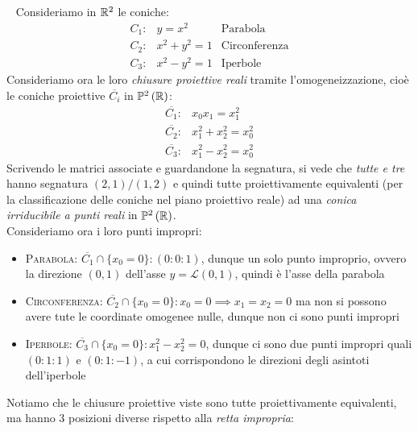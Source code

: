\begin{examples}~{}
	Consideriamo in $\mathbb{R}^2$ le coniche:
	\begin{equation*}
		\begin{array}{cll}
			C_1\colon & y=x^2 & 	\text{Parabola}\\[1mm]
			C_2\colon & x^2+y^2=1 &		\text{Circonferenza}\\[1mm]
			C_3\colon &	x^2-y^2=1 & \text{Iperbole}
		\end{array}
	\end{equation*}
	Consideriamo ora le loro \textit{chiusure proiettive reali} tramite l'omogeneizzazione, cioè le coniche proiettive $\overline{C_i}$ in $\proj[2]{\realset}$:
		\begin{equation*}
		\begin{array}{cl}
			\overline{C_1} \colon & x_0x_1=x_1^2\\[1mm]
			\overline{C_2} \colon & x_1^2+x_2^2=x_0^2\\[1mm]
			\overline{C_3} \colon & x_1^2-x_2^2=x_0^2
		\end{array}
	\end{equation*}
	Scrivendo le matrici associate e guardandone la segnatura, si vede che \textit{tutte e tre} hanno segnatura $(2,1)/(1,2)$ e quindi tutte proiettivamente equivalenti (per la classificazione delle coniche nel piano proiettivo reale) ad una \textit{conica irriducibile a punti reali} in $\proj[2]{\realset}$.\\
	Consideriamo ora i loro punti impropri:
		\begin{itemize}
			\item \textsc{Parabola}: $\overline{C_1}\cap\{x_0=0\}\colon (0\colon 0\colon 1)$, dunque un solo punto improprio, ovvero la direzione $(0,1)$ dell'asse $y=\mathcal{L}(0,1)$, quindi è l'asse della parabola
			\item \textsc{Circonferenza}: $\overline{C_2}\cap \{x_0=0\} \colon x_0=0 \implies x_1=x_2=0$ ma non si possono avere tute le coordinate omogenee nulle, dunque non ci sono punti impropri
			\item \textsc{Iperbole}: $\overline{C_3}\cap\{x_0=0\}\colon x_1^2-x_2^2=0$, dunque ci sono	due punti impropri quali $(0\colon 1\colon 1)$ e $(0\colon 1\colon -1)$, a cui corrispondono le direzioni degli asintoti dell'iperbole
		\end{itemize}
	Notiamo che le chiusure proiettive viste sono tutte proiettivamente equivalenti, ma hanno 3 posizioni diverse rispetto alla \textit{retta impropria}:\\

\end{examples}
